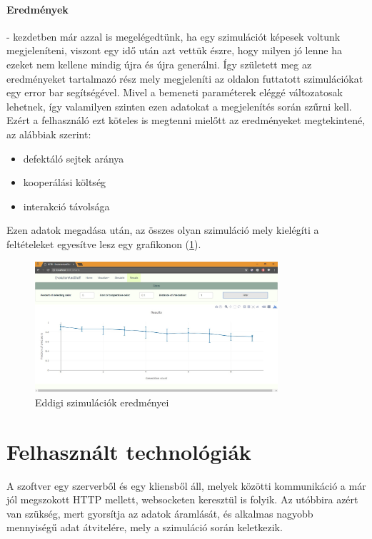 \paragraph{Eredmények}- kezdetben már azzal is megelégedtünk, ha egy szimulációt képesek voltunk megjeleníteni, viszont egy idő után azt vettük észre, hogy milyen jó lenne ha ezeket nem kellene mindig újra és újra generálni. Így született meg az eredményeket tartalmazó rész mely megjeleníti az oldalon futtatott szimulációkat egy error bar segítségével. Mivel a bemeneti paraméterek eléggé változatosak lehetnek, így valamilyen szinten ezen adatokat a megjelenítés során szűrni kell. Ezért a felhasználó ezt köteles is megtenni mielőtt az eredményeket megtekintené, az alábbiak szerint:
\begin{itemize}[noitemsep]
	\item defektáló sejtek aránya
	\item kooperálási költség 
	\item interakció távolsága
\end{itemize}
Ezen adatok megadása után, az összes olyan szimuláció mely kielégíti a feltételeket egyesítve lesz egy grafikonon (\ref{fig:SimulationResults}).

\begin{figure}[ht!]
	\centering
	\includegraphics[width=90mm]{images/SimulationResults.jpg}
	\caption{Eddigi szimulációk eredményei}
	\label{fig:SimulationResults}
\end{figure}


\section{Felhasznált technológiák}

A szoftver egy szerverből és egy kliensből áll, melyek közötti kommunikáció a már jól megszokott HTTP mellett, websocketen keresztül is folyik. Az utóbbira azért van szükség, mert gyorsítja az adatok áramlását, és alkalmas nagyobb mennyiségű adat átvitelére, mely a szimuláció során keletkezik. 

